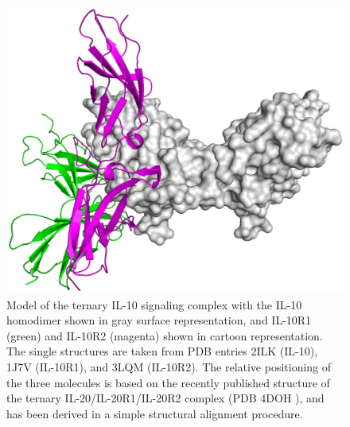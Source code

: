 \begin{figure}
\centering
\includegraphics[width=1.0\textwidth]{gfx/background/il10dimer_surface_r1cartoon_r2cartoon_front_06_small.jpg}
\caption[]{
Model of the ternary IL-10 signaling complex with the IL-10 homodimer shown in
gray surface representation, and IL-10R1 (green) and IL-10R2 (magenta) shown in
cartoon representation. The single structures are taken from PDB entries 2ILK
(IL-10), 1J7V (IL-10R1), and 3LQM (IL-10R2). The relative positioning of the
three molecules is based on the recently published structure of the ternary
IL-20/IL-20R1/IL-20R2 complex (PDB 4DOH \cite{logsdon_il20r2compl_2012}), and
has been derived in a simple structural alignment procedure.}
\label{fig:bg:il10_il10r1_il10r2_model}
\end{figure}

